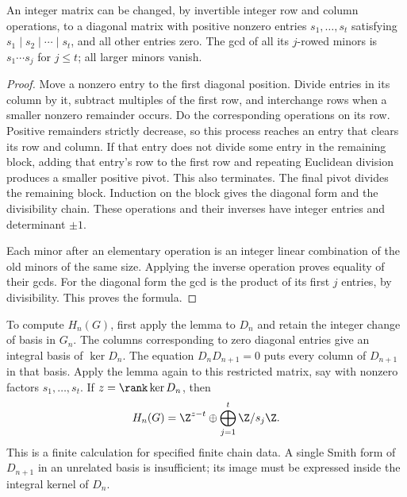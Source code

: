 \begin{lemma}\label{ntg:lem:smith}
An integer matrix can be changed, by invertible integer row and column
operations, to a diagonal matrix with positive nonzero entries
$s_1,\ldots,s_t$ satisfying $s_1\mid s_2\mid\cdots\mid s_t$,
and all other entries zero. The gcd of all its $j$-rowed minors is
$s_1\cdots s_j$ for $j\le t$; all larger minors vanish.
\end{lemma}
\begin{proof}
Move a nonzero entry to the first diagonal position. Divide entries
in its column by it, subtract multiples of the first row, and interchange
rows when a smaller nonzero remainder occurs. Do the corresponding
operations on its row. Positive remainders strictly decrease, so this
process reaches an entry that clears its row and column. If that
entry does not divide some entry in the remaining block, adding that
entry's row to the first row and repeating Euclidean division produces
a smaller positive pivot. This also terminates. The final pivot
divides the remaining block. Induction on the block gives the diagonal
form and the divisibility chain. These operations and their inverses
have integer entries and determinant $\pm1$.

Each minor after an elementary operation is an integer linear
combination of the old minors of the same size. Applying the inverse
operation proves equality of their gcds. For the diagonal form the gcd
is the product of its first $j$ entries, by divisibility. This proves
the formula.
\end{proof}

To compute $H_n(G)$, first apply the lemma to $D_n$ and retain the
integer change of basis in $G_n$. The columns corresponding to zero
diagonal entries give an integral basis of $\ker D_n$. The equation
$D_nD_{n+1}=0$ puts every column of $D_{n+1}$ in that basis. Apply
the lemma again to this restricted matrix, say with nonzero factors
$s_1,\ldots,s_t$. If $z=\rank\ker D_n$, then
\begin{equation}\label{ntg:eq:homology-algorithm}
 H_n(G)=\Z^{z-t}\oplus\bigoplus_{j=1}^t\Z/s_j\Z.
\end{equation}
This is a finite calculation for specified finite chain data. A single
Smith form of $D_{n+1}$ in an unrelated basis is insufficient; its
image must be expressed inside the integral kernel of $D_n$.

